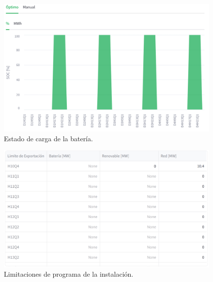 \begin{figure}
  \centering
  \includegraphics[width=0.75\linewidth]{figures/soc-bess.png}
  \caption[Estado de carga de la batería.]{Estado de carga de la batería.}
  \label{fig:soc-bess}
\end{figure}

\begin{figure}
  \centering
  \includegraphics[width=0.75\linewidth]{figures/limitaciones-tecnicas.png}
  \caption[Limitaciones de programa de la instalación.]{Limitaciones de programa de la instalación.}
  \label{fig:limitaciones-tecnicas}
\end{figure}
